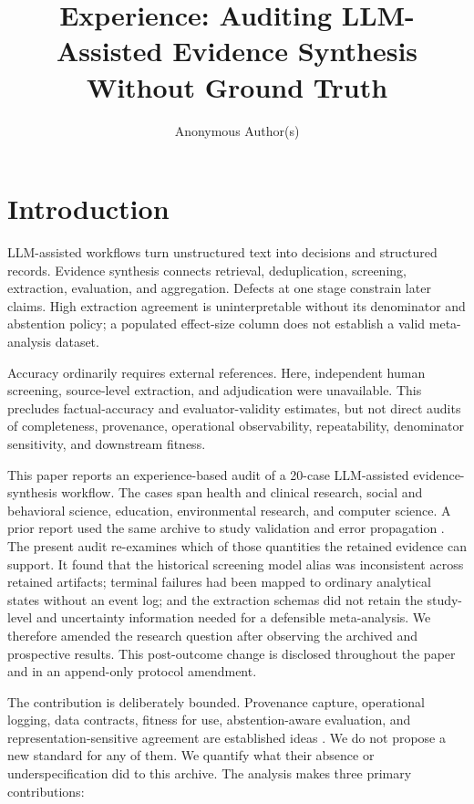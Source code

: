 \documentclass[acmsmall,anonymous,review]{acmart}
\title{Experience: Auditing LLM-Assisted Evidence Synthesis Without Ground Truth}
\author{Anonymous Author(s)}
\affiliation{%
  \institution{Anonymous Institution}
  \country{Anonymous}}
\begin{document}
\maketitle

\section{Introduction}

LLM-assisted workflows turn unstructured text into decisions and structured records. Evidence synthesis connects retrieval, deduplication, screening, extraction, evaluation, and aggregation. Defects at one stage constrain later claims. High extraction agreement is uninterpretable without its denominator and abstention policy; a populated effect-size column does not establish a valid meta-analysis dataset.

Accuracy ordinarily requires external references. Here, independent human screening, source-level extraction, and adjudication were unavailable. This precludes factual-accuracy and evaluator-validity estimates, but not direct audits of completeness, provenance, operational observability, repeatability, denominator sensitivity, and downstream fitness.

This paper reports an experience-based audit of a 20-case LLM-assisted evidence-synthesis workflow. The cases span health and clinical research, social and behavioral science, education, environmental research, and computer science. A prior report used the same archive to study validation and error propagation \cite{anonymous2026prior}. The present audit re-examines which of those quantities the retained evidence can support. It found that the historical screening model alias was inconsistent across retained artifacts; terminal failures had been mapped to ordinary analytical states without an event log; and the extraction schemas did not retain the study-level and uncertainty information needed for a defensible meta-analysis. We therefore amended the research question after observing the archived and prospective results. This post-outcome change is disclosed throughout the paper and in an append-only protocol amendment.

The contribution is deliberately bounded. Provenance capture, operational logging, data contracts, fitness for use, abstention-aware evaluation, and representation-sensitive agreement are established ideas \cite{w3cprov2013,polyzotis2021mlmd,sre2016monitoring,wang1996beyond,shacl2017,wen2025abstention}. We do not propose a new standard for any of them. We quantify what their absence or underspecification did to this archive. The analysis makes three primary contributions:
\end{document}
